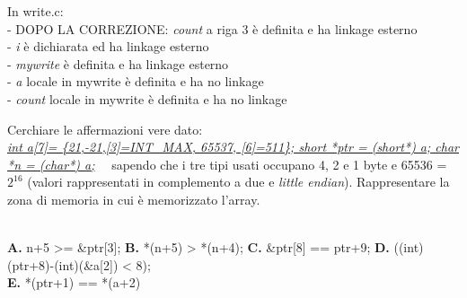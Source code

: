 \begin{questions}
\begin{minipage}[h]{0.5\linewidth}
{In write.c:\\
- DOPO LA CORREZIONE: \emph{count} a riga 3 è definita e ha linkage esterno\\
- \emph{i} è dichiarata ed ha linkage esterno\\
- \emph{mywrite} è definita e ha linkage esterno\\
- \emph{a} locale in mywrite è definita e ha no linkage\\
- \emph{count} locale in mywrite è definita e ha no linkage\\
}
\end{minipage}




\question[6]
Cerchiare le affermazioni vere dato:\\ 
\underline{\emph{int a[7]= \{21,-21,[3]=INT\_MAX, 65537, [6]=511\}; short *ptr = (short*) a; char *n = (char*) a;}} ~~sapendo che i tre tipi usati occupano 4, 2 e 1 byte e 65536 = $2^{16}$ (valori rappresentati in complemento a due e \emph{little endian}). Rappresentare la zona di memoria in cui è memorizzato l'array.\\~

\textbf{A.} n+5 >= \&ptr[3]; \textbf{B.} *(n+5) > *(n+4); \textbf{C.} \&ptr[8] == ptr+9; \textbf{D.} ((int)(ptr+8)-(int)(\&a[2]) < 8);\\ \textbf{E.} *(ptr+1) == *(a+2)


\end{questions}
